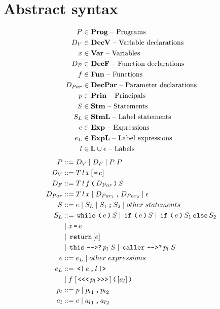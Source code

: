 \section{Abstract syntax}

\begin{align*}
  P       & \in \mathbf{Prog} \text{ -- Programs}\\
  D_V     & \in \mathbf{DecV} \text{ -- Variable declarations}\\
  x       & \in \mathbf{Var} \text{ -- Variables}\\
  D_F     & \in \mathbf{DecF} \text{ -- Function declarations}\\
  f       & \in \mathbf{Fun} \text{ -- Functions}\\
  D_{Par} & \in \mathbf{DecPar} \text{ -- Parameter declarations}\\
  p       & \in \mathbf{Prin} \text{ -- Principals}\\
  S       & \in \mathbf{Stm} \text{ -- Statements}\\
  S_L     & \in \mathbf{StmL} \text{ -- Label statements}\\
  e       & \in \mathbf{Exp} \text{ -- Expressions}\\
  e_L     & \in \mathbf{ExpL} \text{ -- Label expressions}\\
  l       & \in \mathbb{L} \cup \epsilon \text{ -- Labels}\\
\end{align*}
\begin{align*}
  P         & ::= D_V \gp D_F \gp P \; P \\
  D_V       & ::= T \, l \, x \, [\tk = e] \\
  D_F       & ::= T \, l \, f \tk ( D_{Par} \tk ) S \\
  D_{Par}   & ::= T \, l \, x \gp D_{Par_1} \tk , D_{Par_2} \gp \epsilon \\
  S         & ::= e \gp S_L \gp S_1 \tk ; S_2 \gp other \; statements \\
  S_L       & ::= \tk{while} \tk ( e \tk ) S \gp \tk{if} \tk ( e \tk ) S \gp \tk{if} \tk ( e \tk ) S_1 \tk{else} S_2 \\
            & \gp x \tk = e \\
            & \gp \tk{return} [e] \\
            & \gp \tk{this} \tk{-{}->?} p_l \; S \gp \tk{caller} \tk{-{}->?} p_l \; S \\
  e         & ::= e_L \gp other \; expressions \\
  e_L       & ::= \tk{<|} e \tk , l \tk{|>} \\
            & \gp f \; [\tk{<{}<{}<} p_l \tk{>{}>{}>}] \tk ( [a_l] \tk ) \\
  p_l       & ::= p \gp {p_l}_1 \tk , {p_l}_2 \\
  a_l       & ::= e \gp {a_l}_1 \tk , {a_l}_2
\end{align*}
